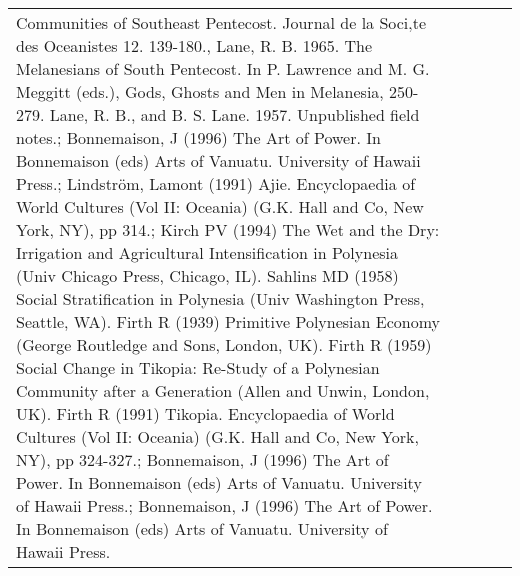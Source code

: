 \begin{longtable}{p{5cm}p{2cm}p{2cm}p{2cm}p{2cm}}
Communities of Southeast Pentecost. Journal de la Soci‚te des Oceanistes 12. 139-180., Lane, R. B. 1965. The Melanesians of South Pentecost. In P. Lawrence and M. G. Meggitt (eds.), Gods, Ghosts and Men in Melanesia, 250-279. Lane, R. B., and B. S. Lane. 1957. Unpublished field notes.; Bonnemaison, J (1996) The Art of Power. In Bonnemaison (eds) Arts of Vanuatu. University of Hawaii Press.; Lindström, Lamont (1991) Ajie. Encyclopaedia of World Cultures (Vol II: Oceania) (G.K. Hall and Co, New York, NY), pp 314.; Kirch PV (1994) The Wet and the Dry: Irrigation and Agricultural Intensification in Polynesia (Univ Chicago Press, Chicago, IL). Sahlins MD (1958) Social Stratification in Polynesia (Univ Washington Press, Seattle, WA). Firth R (1939) Primitive Polynesian Economy (George Routledge and Sons, London, UK). Firth R (1959) Social Change in Tikopia: Re-Study of a Polynesian Community after a Generation (Allen and Unwin, London, UK). Firth R (1991) Tikopia. Encyclopaedia of World Cultures (Vol II: Oceania) (G.K. Hall and Co, New York, NY), pp 324-327.; Bonnemaison, J (1996) The Art of Power. In Bonnemaison (eds) Arts of Vanuatu. University of Hawaii Press.; Bonnemaison, J (1996) The Art of Power. In Bonnemaison (eds) Arts of Vanuatu. University of Hawaii Press. \\ 

\end{longtable}

